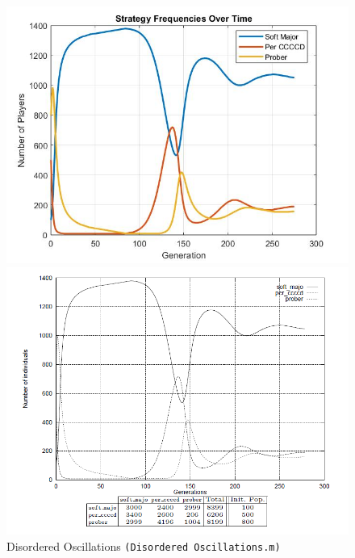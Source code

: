 \begin{figure}[ht!]
	\centering
	\begin{minipage}{0.48\textwidth}
		\includegraphics[width=1\linewidth]{fit_plots_theoretical/Disordered_Oscillations}
		
		
	\end{minipage}
	\begin{minipage}{0.48\textwidth}
		\includegraphics[width=1\linewidth]{Disordered_Oscillations}
	\end{minipage}
	\caption{Disordered Oscillations \texttt{(Disordered Oscillations.m)}}
\end{figure}

